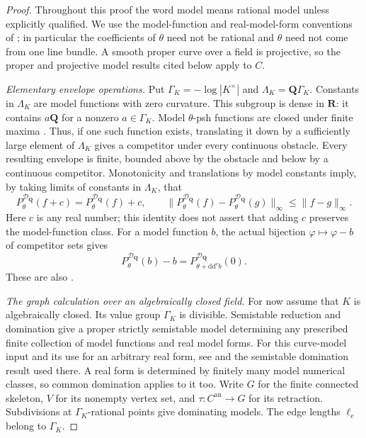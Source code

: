 \begin{proof}
Throughout this proof the word model means rational model unless explicitly
qualified.  We use the model-function and real-model-form conventions of
\cite[\S\S2.2--2.8]{GJKM19}; in particular the coefficients of $\theta$
need not be rational and $\theta$ need not come from one line bundle.
A smooth proper curve over a field is projective, so the proper and
projective model results cited below apply to $C$.

\emph{Elementary envelope operations.}
Put $\Gamma_K=-\log|K^\times|$ and
$\Lambda_K=\mathbf Q\Gamma_K$.  Constants in $\Lambda_K$ are model
functions with zero curvature.  This subgroup is dense in $\mathbf R$:
it contains $a\mathbf Q$ for a nonzero $a\in\Gamma_K$.
Model $\theta$-psh functions are closed under finite maxima
\cite[\S2.5]{GJKM19}.  Thus, if one such function exists, translating it
down by a sufficiently large element of $\Lambda_K$ gives a competitor
under every continuous obstacle.  Every resulting envelope is finite,
bounded above by the obstacle and below by a continuous competitor.
Monotonicity and translations by model constants imply, by taking limits
of constants in $\Lambda_K$, that
\begin{equation}
\label{eq:ch23-curve-envelope-basic-operations}
 P^{\mathcal D_{\mathbf Q}}_\theta(f+c)
       =P^{\mathcal D_{\mathbf Q}}_\theta(f)+c,
 \qquad
 \|P^{\mathcal D_{\mathbf Q}}_\theta(f)
       -P^{\mathcal D_{\mathbf Q}}_\theta(g)\|_\infty
       \leq\|f-g\|_\infty.
\end{equation}
Here $c$ is any real number; this identity does not assert that adding
$c$ preserves the model-function class.  For a model function $b$, the
actual bijection $\varphi\mapsto\varphi-b$ of competitor sets gives
\begin{equation}
\label{eq:ch23-curve-model-obstacle-translation}
 P^{\mathcal D_{\mathbf Q}}_\theta(b)-b
       =P^{\mathcal D_{\mathbf Q}}_{\theta+\mathrm d\mathrm d^cb}(0).
\end{equation}
These are also \cite[Proposition~2.9(3)--(5)]{GJKM19}.

\emph{The graph calculation over an algebraically closed field.}
For now assume that $K$ is algebraically closed.  Its value group
$\Gamma_K$ is divisible.  Semistable reduction and domination give a
proper strictly semistable model determining any prescribed finite
collection of model functions and real model forms.  For this curve-model
input and its use for an arbitrary real form, see
\cite[proof of Proposition~3.7]{GJKM19} and the semistable domination
result \cite[\S7]{BL85} used there.  A real form is determined by finitely
many model numerical classes, so common domination applies to it too.
Write $G$ for the finite connected skeleton, $V$ for its nonempty vertex
set, and $\tau:C^{\mathrm{an}}\to G$ for its retraction.  Subdivisions
at $\Gamma_K$-rational points give dominating models.  The edge lengths
$\ell_e$ belong to $\Gamma_K$.


\end{proof}

